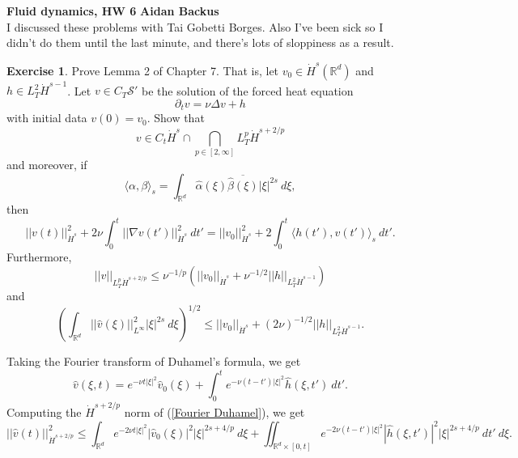\documentclass[10pt]{article}
\newcommand{\RR}{\mathbb{R}}
\newcommand{\Sch}{\mathcal{S}}
\theoremstyle{definition}
\newtheorem{exer}{Exercise}
\begin{document}
\noindent
\large\textbf{Fluid dynamics, HW 6} \hfill \textbf{Aidan Backus} \\

I discussed these problems with Tai Gobetti Borges. Also I've been sick so I didn't do them until the last minute, and there's lots of sloppiness as a result.

\begin{exer}
Prove Lemma 2 of Chapter 7. That is, let $v_0 \in \dot H^s(\RR^d)$ and $h \in L^2_T\dot H^{s-1}$.
Let $v \in C_T\Sch'$ be the solution of the forced heat equation
$$\partial_t v = \nu \Delta v + h$$
with initial data $v(0) = v_0$.
Show that
\begin{equation}
\label{v in spaces}
v \in C_t\dot H^s \cap \bigcap_{p \in [2, \infty]} L^p_T \dot H^{s+2/p}
\end{equation}
and moreover, if
$$\langle \alpha, \beta\rangle_s = \int_{\RR^d} \hat \alpha(\xi) \overline{\hat \beta(\xi)} |\xi|^{2s} ~d\xi,$$
then
\begin{equation}
\label{energy balance}
||v(t)||_{\dot H^s}^2 + 2\nu \int_0^t ||\nabla v(t')||_{\dot H^s}^2 ~dt' = ||v_0||_{\dot H^s}^2 + 2\int_0^t \langle h(t'), v(t')\rangle_s ~dt'.
\end{equation}
Furthermore,
\begin{equation}
\label{L^pH^s bound}
||v||_{L^p_T \dot H^{s + 2/p}} \leq \nu^{-1/p}(||v_0||_{\dot H^s} + \nu^{-1/2}||h||_{L^2_T \dot H^{s-1}})
\end{equation}
and
\begin{equation}
\label{timespace bound}
\left(\int_{\RR^d} ||\hat v(\xi)||^2_{L^\infty} |\xi|^{2s} ~d\xi\right)^{1/2} \leq ||v_0||_{\dot H^s} + (2\nu)^{-1/2} ||h||_{L^2_T \dot H^{s-1}}.
\end{equation}
\end{exer}

Taking the Fourier transform of Duhamel's formula, we get
\begin{equation}
\label{Fourier Duhamel}
\hat v(\xi, t) = e^{-\nu t|\xi|^2} \hat v_0(\xi) + \int_0^t e^{-\nu(t - t')|\xi|^2} \hat h(\xi, t') ~dt'.
\end{equation}
Computing the $\dot H^{s+2/p}$ norm of (\ref{Fourier Duhamel}), we get
$$||\hat v(t)||_{\dot H^{s+2/p}}^2 \leq \int_{\RR^d} e^{-2\nu t|\xi|^2} |\hat v_0(\xi)|^2 |\xi|^{2s+4/p} ~d\xi + \iint_{\RR^d \times [0, t]} e^{-2\nu(t - t')|\xi|^2} |\hat h(\xi, t')|^2 |\xi|^{2s+4/p} ~dt' ~d\xi.$$
\end{document}
